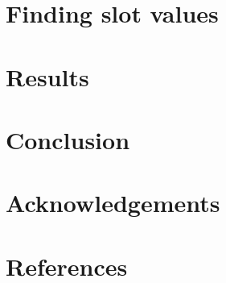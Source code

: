 \documentclass[11pt]{article}
\begin{document}
\section{Finding slot values}

\section{Results}

\section{Conclusion}

\section{Acknowledgements}

\section{References}

\end{document}
